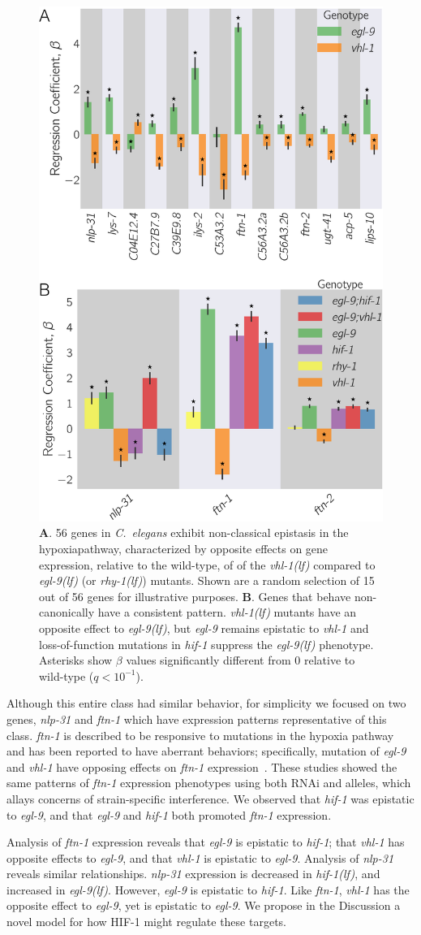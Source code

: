 \documentclass[9pt,twocolumn,twoside]{pnas-new}
\newcommand{\qval}[1]{$q<10^{-#1}$}
\newcommand{\cel}{\emph{C.~elegans}}
\newcommand{\gene}[1]{\mbox{\emph{#1}}}
\newcommand{\nlp}{\gene{nlp-31}}
\newcommand{\ftna}{\gene{ftn-1}}
\newcommand{\egl}{\gene{egl-9(lf)}}
\newcommand{\rhy}{\gene{rhy-1(lf)}}
\newcommand{\vhl}{\gene{vhl-1(lf)}}
\newcommand{\hif}{\gene{hif-1(lf)}}
\newcommand{\hifp}{HIF-1}
\newcommand{\hifohtargets}{56}
\begin{document}
\begin{figure}[tbhp]
  \centering
  \includegraphics[width=.4\textwidth]{../figs/hif1oh_epistasis.pdf}
  \caption{
    \textbf{A}. \hifohtargets{} genes in \cel{} exhibit non-classical epistasis
    in the hypoxiapathway, characterized by opposite effects on gene expression,
    relative to the wild-type, of of the \vhl{} compared to \egl{} (or \rhy{})
    mutants. Shown are a random selection of 15 out of \hifohtargets{} genes for
    illustrative purposes. \textbf{B}. Genes that behave non-canonically  have a
    consistent pattern. \vhl{} mutants have an opposite effect to \egl{}, but
    \gene{egl-9} remains epistatic to \gene{vhl-1} and loss-of-function
    mutations in \gene{hif-1} suppress the \egl{} phenotype. Asterisks show
    $\beta$ values significantly different from 0 relative to wild-type
    (\qval{1}).
  }
\label{fig:hif1oh}
\end{figure}

Although this entire class had similar behavior, for simplicity we focused on
two genes, \nlp{} and \ftna{} which have expression patterns representative of
this class. \ftna{} is described to be responsive to mutations in the hypoxia
pathway and has been reported to have aberrant behaviors; specifically, mutation
of \gene{egl-9} and \gene{vhl-1} have opposing effects on \ftna{}
expression~\cite{Ackerman2012,Romney2011}. These studies showed the same
patterns of \ftna{} expression phenotypes using both RNAi and alleles, which
allays concerns of strain-specific interference. We observed that \gene{hif-1}
was epistatic to \gene{egl-9}, and that \gene{egl-9} and \gene{hif-1} both
promoted \ftna{} expression.

Analysis of \ftna{} expression reveals that \gene{egl-9} is epistatic to
\gene{hif-1}; that \gene{vhl-1} has opposite effects to \gene{egl-9}, and that
\gene{vhl-1} is epistatic to \gene{egl-9}. Analysis of \nlp{} reveals similar
relationships. \nlp{} expression is decreased in \hif{}, and increased in
\egl{}. However, \gene{egl-9} is epistatic to \gene{hif-1}. Like \ftna{},
\gene{vhl-1} has the opposite effect to \gene{egl-9}, yet is epistatic to
\gene{egl-9}. We propose in the Discussion a novel model for how \hifp{} might
regulate these targets.
\end{document}
